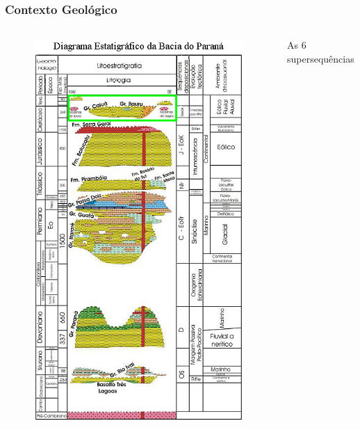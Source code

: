 \documentclass[aspectratio=10]{beamer} %
\begin{document}
\begin{frame}
\begin{columns}
\begin{column}{0.75\textwidth}
\end{column}


\end{columns}
\end{frame}	

\begin{frame}
\frametitle{Contexto Geológico}
\begin{columns}
\begin{column}{0.4\textwidth}
\begin{figure}
\includegraphics[scale=0.36]{Imagens/diagramabauru.png}
\end{figure}
\end{column}
\begin{column}{0.75\textwidth}
\begin{block}{As $6$ supersequências}

\end{block}
\end{column}
\end{columns}
\end{frame}
\end{document}
